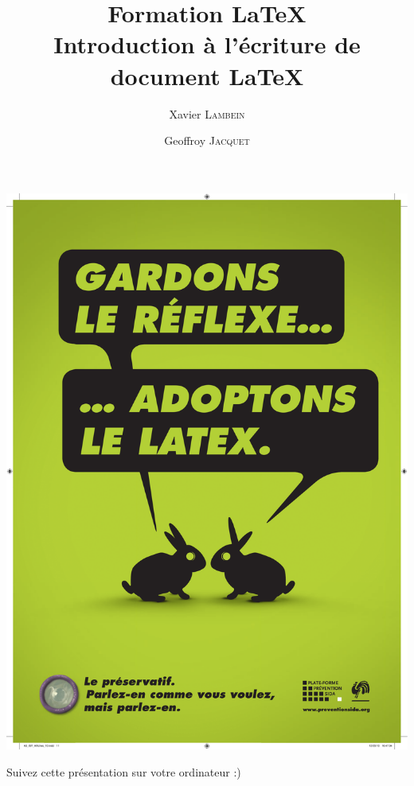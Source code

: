 \documentclass[10pt,svgnames,usenames,table]{beamer} %
\institute{Louvain-li-Nux}
\title{\textbf{Formation \LaTeX}\\
Introduction à l'écriture de document \textrm{\LaTeX}}
\author{Xavier \textsc{Lambein} \and Geoffroy \textsc{Jacquet}}
\begin{document}
\begin{landscape}
  \begin{frame}
    \vspace{-.5cm}
    \hspace*{.1mm}
    \includegraphics[page=1,height=\paperwidth]{latex_sida.pdf}
  \end{frame}
\end{landscape}

\begin{frame}
  \begin{center}\Large
  Suivez cette présentation sur votre ordinateur :)
  
  \vspace{1cm}
  \end{center}
\end{frame}
\end{document}
